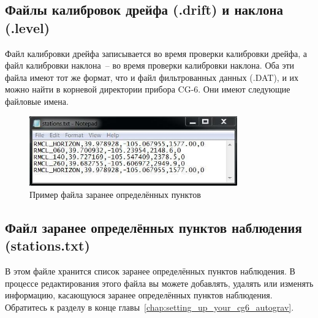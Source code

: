 \subsection[Файлы калибровок дрейфа и наклона (.level)]{Файлы калибровок дрейфа (.drift) и наклона (.level)}

Файл калибровки дрейфа записывается во время проверки калибровки дрейфа, а файл
калибровки наклона~-- во время проверки калибровки наклона. Оба эти файла имеют
тот же формат, что и файл фильтрованных данных (.DAT), и их можно найти в
корневой директории прибора CG-6. Они имеют следующие файловые имена.



\begin{figure}[H]
  \centering
  \includegraphics[width=0.8\textwidth]{figures/sample_pre-set_stations_file_from_a_cg6_autograv}
  \caption{Пример файла заранее определённых пунктов \cg{}}
  \label{fig:sample_pre-set_stations_file_from_a_cg6_autograv}
\end{figure}

\subsection[Файл заранее определённых пунктов наблюдения]{Файл заранее определённых пунктов наблюдения (stations.txt)}

В этом файле хранится список заранее определённых пунктов наблюдения. В
процессе редактирования этого файла вы можете добавлять, удалять или
изменять информацию, касающуюся заранее определённых пунктов наблюдения.
Обратитесь к разделу  в
конце главы~\ref{chap:setting_up_your_cg6_autograv}.

